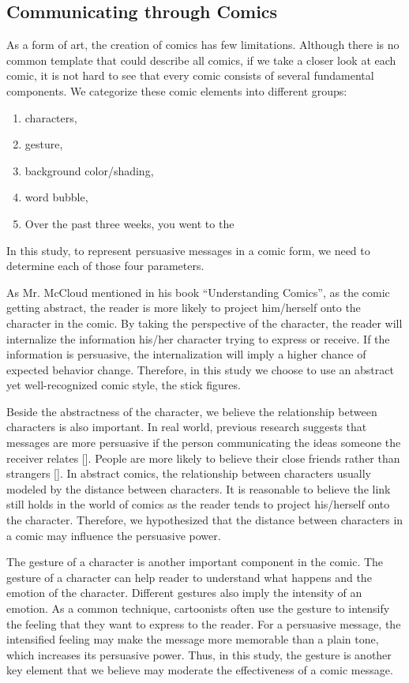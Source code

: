 \subsection{Communicating through Comics}
As a form of art, the creation of comics has few limitations. Although there is no common template that could describe all comics, if we take a closer look at each comic, it is not hard to see that every comic consists of several fundamental components. We categorize these comic elements into different groups:
\begin{enumerate}
\item	characters,
\item gesture,
\item	background color/shading,
\item	word bubble,
\item	Over the past three weeks, you went to the \end{enumerate}\par
In this study, to represent persuasive messages in a comic form, we need to determine each of those four parameters.\par
As Mr. McCloud mentioned in his book “Understanding Comics”, as the comic getting abstract, the reader is more likely to project him/herself onto the character in the comic. By taking the perspective of the character, the reader will internalize the information his/her character trying to express or receive. If the information is persuasive, the internalization will imply a higher chance of expected behavior change. Therefore, in this study we choose to use an abstract yet well-recognized comic style, the stick figures.\par
Beside the abstractness of the character, we believe the relationship between characters is also important. In real world, previous research suggests that messages are more persuasive if the person communicating the ideas someone the receiver relates []. People are more likely to believe their close friends rather than strangers []. In abstract comics, the relationship between characters usually modeled by the distance between characters. It is reasonable to believe the link still holds in the world of comics as the reader tends to project his/herself onto the character. Therefore, we hypothesized that the distance between characters in a comic may influence the persuasive power.\par
The gesture of a character is another important component in the comic. The gesture of a character can help reader to understand what happens and the emotion of the character. Different gestures also imply the intensity of an emotion. As a common technique, cartoonists often use the gesture to intensify the feeling that they want to express to the reader. For a persuasive message, the intensified feeling may make the message more memorable than a plain tone, which increases its persuasive power. Thus, in this study, the gesture is another key element that we believe may moderate the effectiveness of a comic message.
